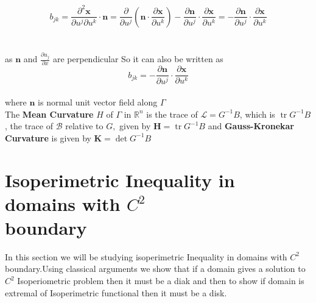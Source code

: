 \documentclass[oneside]{book}
\begin{document}
      $$b_{j k}=\frac{\partial^{2} \mathbf{x}}{\partial u^{j} \partial u^{k}} \cdot \mathbf{n}=\frac{\partial}{\partial u^{j}}\left(\mathbf{n} \cdot \frac{\partial \mathbf{x}}{\partial u^{k}}\right)-\frac{\partial \mathbf{n}}{\partial u^{j}} \cdot \frac{\partial \mathbf{x}}{\partial u^{k}}=-\frac{\partial \mathbf{n}}{\partial u^{j}} \cdot \frac{\partial \mathbf{x}}{\partial u^{k}}$$ \\\\
      
      
       as $\boldsymbol{n}$ and $\frac{\partial u_{j}}{\partial x} $ are perpendicular
      So it can also be written as 
        \begin{equation}
        \label{eq22}  
       b_{j k} = -\frac{\partial \mathbf{n}}{\partial u^{j}} \cdot \frac{\partial \mathbf{x}}{\partial u^{k}}         \end{equation} \\
       where $\mathbf{n}$ is normal unit vector field along $\Gamma$ \\

      
      The \textbf{Mean Curvature} $H$ of $\Gamma$ in $\mathbb{R}^{n}$ is the trace of $\mathcal{L} = G^{-1} B$, which is $\operatorname{tr} G^{-1} B$, the trace of $\mathcal{B}$ relative
to $G,$ given by
$
\boldsymbol{H}=\operatorname{tr} G^{-1} B
$ and \textbf{Gauss-Kronekar Curvature} is given by $\boldsymbol{K}=\operatorname{det} {G}^{-1} {B}$





\section{Isoperimetric Inequality in domains with $C^{2}$ \\boundary} 
\label{s:5}
In this section we will be studying isoperimetric Inequality in domains with $C^{2}$ boundary.Using classical arguments we show that if a domain gives a solution to $C^{2}$  Isoperiometric problem then it must be a diak and then to show if domain is extremal of Isoperimetric functional then it must be a disk.
\end{document}
